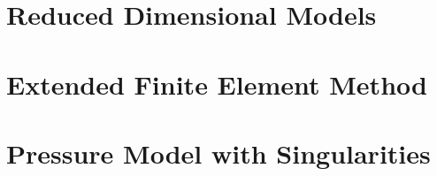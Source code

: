 \documentclass[bibliography=totocnumbered,dvipsnames,FM,Dis, EN]{tulthesis_autoreferat}
\begin{document}





\chapter{Reduced Dimensional Models} \label{chap:reduced}



% 



\chapter{Extended Finite Element Method} \label{chap:xfem_soa}



% 


\chapter{Pressure Model with Singularities} \label{chap:xfem_pressure}



% 

% 
\end{document}

